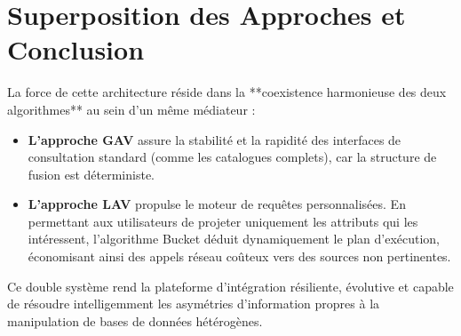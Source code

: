 \documentclass[12pt,a4paper]{article}
\begin{document}
\section{Superposition des Approches et Conclusion}

La force de cette architecture réside dans la **coexistence harmonieuse des deux algorithmes** au sein d'un même médiateur :

\begin{itemize}
    \item \textbf{L'approche GAV} assure la stabilité et la rapidité des interfaces de consultation standard (comme les catalogues complets), car la structure de fusion est déterministe.
    \item \textbf{L'approche LAV} propulse le moteur de requêtes personnalisées. En permettant aux utilisateurs de projeter uniquement les attributs qui les intéressent, l'algorithme Bucket déduit dynamiquement le plan d'exécution, économisant ainsi des appels réseau coûteux vers des sources non pertinentes.
\end{itemize}

Ce double système rend la plateforme d'intégration résiliente, évolutive et capable de résoudre intelligemment les asymétries d'information propres à la manipulation de bases de données hétérogènes.
\end{document}
